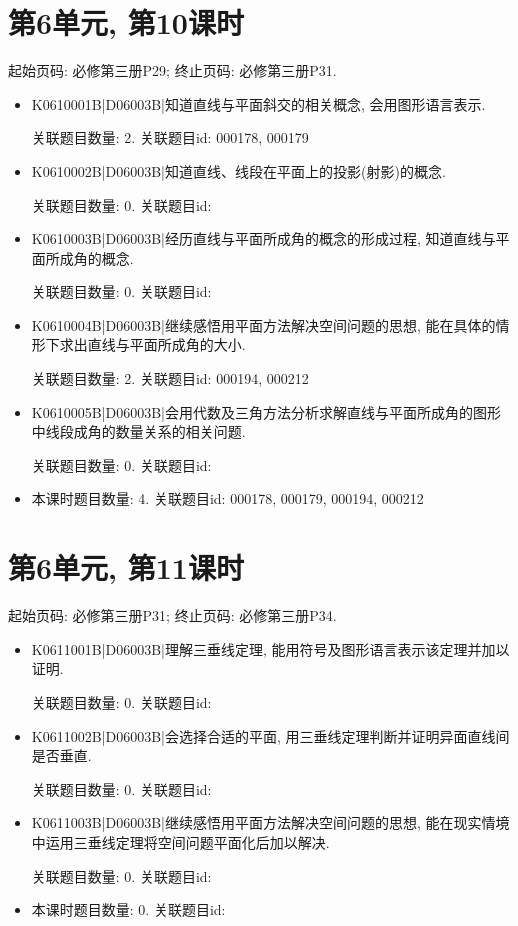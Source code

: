 \section*{第6单元, 第10课时}
起始页码: 必修第三册P29; 终止页码: 必修第三册P31.
\begin{itemize}
\item K0610001B|D06003B|知道直线与平面斜交的相关概念, 会用图形语言表示.

关联题目数量: 2. 关联题目id: 000178, 000179

\item K0610002B|D06003B|知道直线、线段在平面上的投影(射影)的概念.

关联题目数量: 0. 关联题目id: 

\item K0610003B|D06003B|经历直线与平面所成角的概念的形成过程, 知道直线与平面所成角的概念.

关联题目数量: 0. 关联题目id: 

\item K0610004B|D06003B|继续感悟用平面方法解决空间问题的思想, 能在具体的情形下求出直线与平面所成角的大小.

关联题目数量: 2. 关联题目id: 000194, 000212

\item K0610005B|D06003B|会用代数及三角方法分析求解直线与平面所成角的图形中线段成角的数量关系的相关问题.

关联题目数量: 0. 关联题目id: 

\item 本课时题目数量: 4. 关联题目id: 000178, 000179, 000194, 000212

\end{itemize}

\section*{第6单元, 第11课时}
起始页码: 必修第三册P31; 终止页码: 必修第三册P34.
\begin{itemize}
\item K0611001B|D06003B|理解三垂线定理, 能用符号及图形语言表示该定理并加以证明.

关联题目数量: 0. 关联题目id: 

\item K0611002B|D06003B|会选择合适的平面, 用三垂线定理判断并证明异面直线间是否垂直.

关联题目数量: 0. 关联题目id: 

\item K0611003B|D06003B|继续感悟用平面方法解决空间问题的思想, 能在现实情境中运用三垂线定理将空间问题平面化后加以解决.

关联题目数量: 0. 关联题目id: 

\item 本课时题目数量: 0. 关联题目id: 

\end{itemize}

